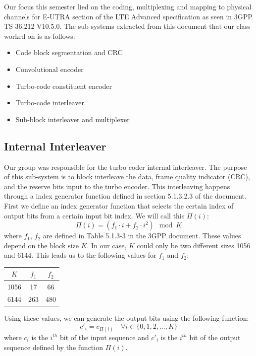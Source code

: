 \documentclass[letterpaper, 12pt]{article} %
\begin{document}
        Our focus this semester lied on the coding, multiplexing and mapping to physical channels for E-UTRA section of the LTE Advanced specification as seen in 3GPP TS 36.212 V10.5.0. The sub-systems extracted from this document that our class worked on is as follows:
        \begin{itemize}
            \item Code block segmentation and CRC
            \item Convolutional encoder
            \item Turbo-code constituent encoder
            \item Turbo-code interleaver
            \item Sub-block interleaver and multiplexer
        \end{itemize}
    \subsection{Internal Interleaver}
        Our group was responsible for the turbo coder internal interleaver. The purpose of this sub-system is to block interleave the data, frame quality indicator (CRC), and the reserve bits input to the turbo encoder. This interleaving happens through a index generator function defined in section 5.1.3.2.3 of the document. First we define an index generator function that selects the certain index of output bits from a certain input bit index. We will call this $\Pi(i)$:
        $$\Pi(i) = (f_1\cdot i + f_2\cdot i^2 )\mod K$$
        where $f_1$, $f_2$ are defined in Table 5.1.3-3 in the 3GPP document. These values depend on the block size $K$. In our case, $K$ could only be two different sizes 1056 and 6144. This leads us to the following values for $f_1$ and $f_2$:
        \renewcommand\arraystretch{1.2}
        \begin{center}
            \begin{tabular}{|c|c|c|}
            \hline
                $K$ & $f_1$ & $f_2$  \\ \hline
                1056 & 17 & 66 \\ \hline
                6144 & 263 & 480 \\ \hline
            \end{tabular}
        \end{center}
        Using these values, we can generate the output bits using the following function:
        $$c'_i = c_{\Pi(i)} \quad\forall i \in \{0, 1, 2, ..., K\}$$
        where $c_i$ is the $i^{th}$ bit of the input sequence and $c'_i$ is the $i^{th}$ bit of the output sequence defined by the function $\Pi(i)$.
\end{document}
